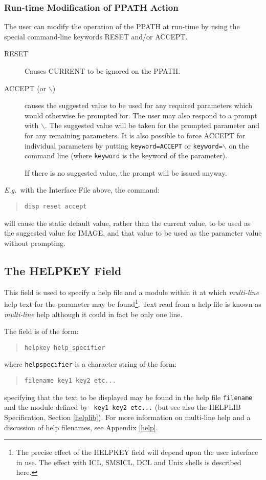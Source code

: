 \documentclass[twoside,11pt]{article}
\newcommand{\xlabel}[1]{}
\renewcommand{\_}{\texttt{\symbol{95}}}
\begin{document}
\subsubsection*{Run-time Modification of PPATH Action}
The user can modify the operation of the PPATH at run-time by using the
special command-line keywords RESET and/or ACCEPT.
\begin{description}
\item[RESET] Causes CURRENT to be ignored on the PPATH.
\item[ACCEPT (or $\backslash$)] causes the suggested value to be used for any
required parameters which would otherwise be prompted for.
The user may also respond to a prompt with
\texttt{$\backslash$}. The suggested value will be taken for the prompted parameter and
for any remaining parameters.
It is also possible to force ACCEPT for individual parameters by putting
\texttt{keyword=ACCEPT} or \texttt{keyword=$\backslash$} on the command line (where
\texttt{keyword} is the keyword of the parameter).

If there is no suggested value, the prompt will be issued anyway.
\end{description}
{\em E.g.}\ with the Interface File above, the command:
\begin{quote} \begin{verbatim}
disp reset accept
\end{verbatim} \end{quote}
will cause the static default value, rather than the current value,
to be used as the suggested value for IMAGE, and that value to be used as the
parameter value without prompting.

\subsection{The HELPKEY Field\xlabel{the_helpkey_field}}

This field is used to specify a help file and a module within it at which
{\em multi-line} help text for the parameter may be found\footnote{
The precise effect of the HELPKEY field will depend upon the user interface
in use.
The effect with ICL, SMSICL, DCL and Unix shells is described here.}.
Text read from a help file is known as {\em multi-line} help although it could
in fact be only one line.

The field is of the form:
\begin{quote} \begin{verbatim}
helpkey help_specifier
\end{verbatim} \end{quote}
where \texttt{help\_specifier} is a character string of the form:
\begin{quote} \begin{verbatim}
filename key1 key2 etc...
\end{verbatim} \end{quote}
specifying that the text to be displayed may be found in the help file
\texttt{filename} and the module defined by \texttt{ key1 key2 etc...} (but see
also the HELPLIB Specification, Section \ref{helplib}).
For more information on multi-line help and a discussion of help filenames,
see Appendix \ref{help}.
\end{document}
